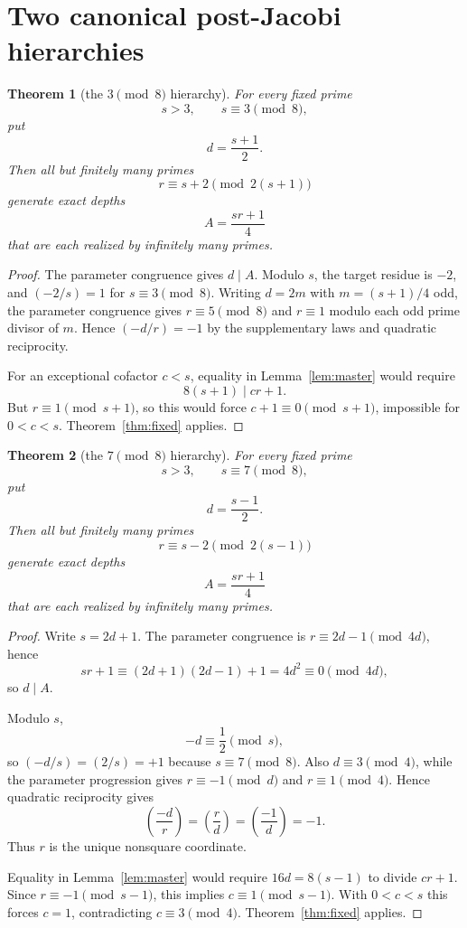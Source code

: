 \documentclass[11pt]{article}
\newtheorem{theorem}{Theorem}
\theoremstyle{definition}
\begin{document}
\section{Two canonical post-Jacobi hierarchies}
\begin{theorem}[the $3\pmod8$ hierarchy]\label{thm:hier3}
For every fixed prime
\[
s>3,\qquad s\equiv3\pmod8,
\]
put
\[
d=\frac{s+1}{2}.
\]
Then all but finitely many primes
\[
\boxed{r\equiv s+2\pmod{2(s+1)}}
\]
generate exact depths
\[
\boxed{A=\frac{sr+1}{4}}
\]
that are each realized by infinitely many primes.
\end{theorem}

\begin{proof}
The parameter congruence gives $d\mid A$. Modulo $s$, the target residue is $-2$, and $(-2/s)=1$ for $s\equiv3\pmod8$. Writing $d=2m$ with $m=(s+1)/4$ odd, the parameter congruence gives $r\equiv5\pmod8$ and $r\equiv1$ modulo each odd prime divisor of $m$. Hence $(-d/r)=-1$ by the supplementary laws and quadratic reciprocity.

For an exceptional cofactor $c<s$, equality in Lemma~\ref{lem:master} would require
\[
8(s+1)\mid cr+1.
\]
But $r\equiv1\pmod{s+1}$, so this would force $c+1\equiv0\pmod{s+1}$, impossible for $0<c<s$. Theorem~\ref{thm:fixed} applies.
\end{proof}

\begin{theorem}[the $7\pmod8$ hierarchy]\label{thm:hier7}
For every fixed prime
\[
s>3,\qquad s\equiv7\pmod8,
\]
put
\[
d=\frac{s-1}{2}.
\]
Then all but finitely many primes
\[
\boxed{r\equiv s-2\pmod{2(s-1)}}
\]
generate exact depths
\[
\boxed{A=\frac{sr+1}{4}}
\]
that are each realized by infinitely many primes.
\end{theorem}

\begin{proof}
Write $s=2d+1$. The parameter congruence is $r\equiv2d-1\pmod{4d}$, hence
\[
sr+1\equiv(2d+1)(2d-1)+1=4d^2\equiv0\pmod{4d},
\]
so $d\mid A$.

Modulo $s$,
\[
-d\equiv\frac12\pmod s,
\]
so $(-d/s)=(2/s)=+1$ because $s\equiv7\pmod8$. Also $d\equiv3\pmod4$, while the parameter progression gives $r\equiv-1\pmod d$ and $r\equiv1\pmod4$. Hence quadratic reciprocity gives
\[
\left(\frac{-d}{r}\right)
=\left(\frac{r}{d}\right)
=\left(\frac{-1}{d}\right)
=-1.
\]
Thus $r$ is the unique nonsquare coordinate.

Equality in Lemma~\ref{lem:master} would require $16d=8(s-1)$ to divide $cr+1$. Since $r\equiv-1\pmod{s-1}$, this implies $c\equiv1\pmod{s-1}$. With $0<c<s$ this forces $c=1$, contradicting $c\equiv3\pmod4$. Theorem~\ref{thm:fixed} applies.
\end{proof}
\end{document}
